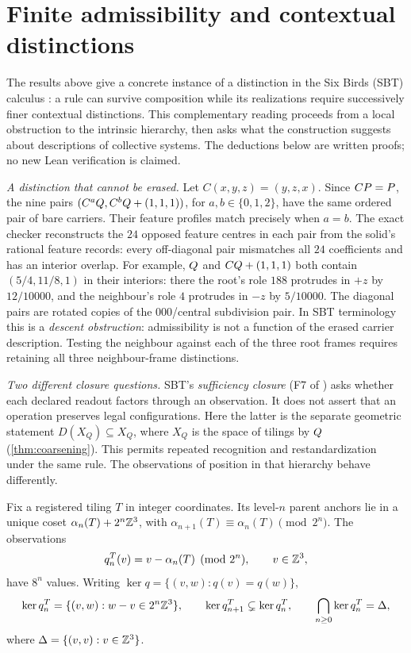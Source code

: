 \section{Finite admissibility and contextual distinctions}\label{sec:context}

The results above give a concrete instance of a distinction in the Six Birds (SBT)
calculus \cite{Tsi26F4}: a rule can survive composition while its realizations require
successively finer contextual distinctions. This complementary reading proceeds from
a local obstruction to the intrinsic hierarchy, then asks what the construction
suggests about descriptions of collective systems. The deductions below are written
proofs; no new Lean verification is claimed.

\emph{A distinction that cannot be erased.}
Let $C(x,y,z)=(y,z,x)$. Since $CP=P$, the nine pairs
$(C^aQ,C^bQ+(1,1,1))$, for $a,b\in\{0,1,2\}$, have the same ordered
pair of bare carriers. Their feature profiles match precisely when $a=b$.
The exact checker  reconstructs the $24$
opposed feature centres in each pair from the solid's rational feature records:
every off-diagonal pair mismatches all $24$ coefficients and has an interior overlap.
For example, $Q$ and $CQ+(1,1,1)$ both contain
$(5/4,11/8,1)$ in their interiors: there the root's role $188$ protrudes in $+z$
by $12/10000$, and the neighbour's role $4$ protrudes in $-z$ by $5/10000$.
The diagonal pairs are rotated copies of the $000$/central subdivision pair.
In SBT terminology this is a \emph{descent obstruction}: admissibility is not a
function of the erased carrier description. Testing the neighbour against each
of the three root frames requires retaining all three neighbour-frame distinctions.

\emph{Two different closure questions.}
SBT's \emph{sufficiency closure} (F7 of \cite{Tsi26F4}) asks whether each declared
readout factors through an observation. It does not assert that an operation
preserves legal configurations. Here the latter is the separate geometric statement
$D(X_Q)\subseteq X_Q$, where $X_Q$ is the space of tilings by $Q$
(\cref{thm:coarsening}). This permits repeated recognition and restandardization
under the same rule. The observations of position in that hierarchy behave differently.

\begin{proposition}\label{prop:phases}
Fix a registered tiling $T$ in integer coordinates. Its level-$n$ parent anchors
lie in a unique coset $\alpha_n(T)+2^n\mathbb{Z}^3$, with
$\alpha_{n+1}(T)\equiv\alpha_n(T)\pmod{2^n}$. The observations
\[
 q_n^T(v)=v-\alpha_n(T)\pmod{2^n},\qquad v\in\mathbb{Z}^3,
\]
have $8^n$ values. Writing $\ker q=\{(v,w):q(v)=q(w)\}$,
\[
 \ker q_n^T=\{(v,w):w-v\in2^n\mathbb{Z}^3\},\qquad
 \ker q_{n+1}^T\subsetneq\ker q_n^T,\qquad
 \bigcap_{n\ge0}\ker q_n^T=\Delta,
\]
where $\Delta=\{(v,v):v\in\mathbb{Z}^3\}$.
\end{proposition}

